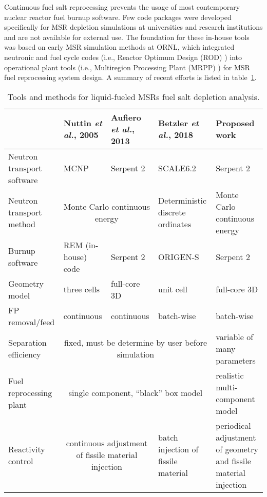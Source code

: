 Continuous fuel salt reprocessing prevents the usage of most contemporary 
nuclear reactor fuel burnup software. Few code packages were developed 
specifically for \gls{MSR} depletion simulations at universities and 
research institutions and are not available for external use. The foundation 
for these in-house tools was based on early \gls{MSR} simulation methods at 
\gls{ORNL}, which integrated neutronic and fuel cycle codes (i.e., Reactor 
Optimum Design (ROD) \cite{bauman_rod_1971}) into operational plant tools 
(i.e., Multiregion Processing Plant (MRPP) \cite{kee_mrpp_1976}) for \gls{MSR} 
fuel reprocessing system design. A summary of recent efforts is listed in  
table~\ref{tab:msr_codes}.
\begin{table}[t]
\fontsize{9}{11}\selectfont
\caption{Tools and methods for liquid-fueled \glspl{MSR} fuel salt depletion 
analysis.}
\begin{tabularx}{\textwidth}{X X X X X} 
\hline 
&Nuttin \emph{et al.}, 2005 \cite{nuttin_potential_2005}& Aufiero \emph{et al.}, 
2013 \cite{aufiero_extended_2013} & Betzler \emph{et al.}, 2018 
\cite{betzler_fuel_2018}&Proposed work \\ [12pt]
\hline
Neutron transport software & \gls{MCNP} & Serpent 2 & SCALE6.2 & Serpent 2 \\ 
[12pt]
Neutron transport method & \multicolumn{2}{c}{Monte Carlo continuous energy} & 
Deterministic discrete ordinates & Monte Carlo continuous energy \\ [12pt]
Burnup software & REM (in-house) code & Serpent 2 & ORIGEN-S & Serpent 2 \\ 
[12pt]
Geometry model & three cells & full-core 3D & unit cell & full-core 3D\\ [12pt]
\gls{FP} removal/feed  & continuous &continuous & batch-wise & batch-wise\\ 
[12pt]
Separation efficiency &\multicolumn{3}{c}{fixed, must be determine by user 
before simulation} & variable of many parameters \\ [12pt]
Fuel reprocessing plant & \multicolumn{3}{c}{single component, ``black'' box 
model} & realistic multi-component model \\ [12pt]
Reactivity control & \multicolumn{2}{c}{continuous adjustment of fissile 
material injection} & batch injection of fissile material & periodical 
adjustment of geometry and fissile material injection\\
\hline
\end{tabularx}
  \label{tab:msr_codes}
\end{table}

